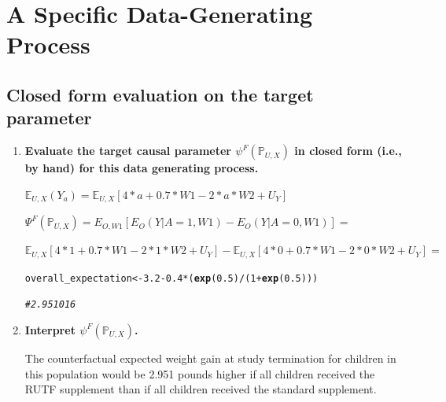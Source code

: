 \documentclass{article}\usepackage[]{graphicx}\usepackage[]{xcolor}
\makeatletter
\newcommand{\hlnum}[1]{\textcolor[rgb]{0.686,0.059,0.569}{#1}}%
\newcommand{\hlcom}[1]{\textcolor[rgb]{0.678,0.584,0.686}{\textit{#1}}}%
\newcommand{\hlopt}[1]{\textcolor[rgb]{0,0,0}{#1}}%
\newcommand{\hlstd}[1]{\textcolor[rgb]{0.345,0.345,0.345}{#1}}%
\newcommand{\hlkwb}[1]{\textcolor[rgb]{0.69,0.353,0.396}{#1}}%
\newcommand{\hlkwd}[1]{\textcolor[rgb]{0.737,0.353,0.396}{\textbf{#1}}}%
\newenvironment{kframe}{%
 \def\at@end@of@kframe{}%
 \ifinner\ifhmode%
  \def\at@end@of@kframe{\end{minipage}}%
  \begin{minipage}{\columnwidth}%
 \fi\fi%
 \def\FrameCommand##1{\hskip\@totalleftmargin \hskip-\fboxsep
 \colorbox{shadecolor}{##1}\hskip-\fboxsep
     \hskip-\linewidth \hskip-\@totalleftmargin \hskip\columnwidth}%
 \MakeFramed {\advance\hsize-\width
   \@totalleftmargin\z@ \linewidth\hsize
   \@setminipage}}%
 {\par\unskip\endMakeFramed%
 \at@end@of@kframe}
\newenvironment{knitrout}{}{} %
\makeatother
\begin{document}
\pagebreak











\section{A Specific Data-Generating Process}

  \subsection{Closed form evaluation on the target parameter}
  
    \begin{enumerate}[label=\textbf{\arabic*.}]
    
      \item \textbf{Evaluate the target causal parameter $\psi^F(\mathbb{P}_{U,X})$ in closed form (i.e., by hand) for this data generating process.}
      
      $\mathbb{E}_{U,X}(Y_a) = \mathbb{E}_{U,X}[4*a + 0.7 * W1 - 2*a*W2 + U_Y]$
      
      $\Psi^F(\mathbb{P}_{U,X}) = E_{O, W1}[E_O(Y | A=1, W1) - E_O(Y | A=0, W1)] = $
      
      $\mathbb{E}_{U,X}[4*1 + 0.7*W1 - 2*1*W2 + U_Y] - \mathbb{E}_{U,X}[4*0 + 0.7*W1 - 2*0*W2 + U_Y] = $
      
      
\begin{knitrout}
\color{fgcolor}\begin{kframe}
\begin{alltt}
\hlstd{overall_expectation} \hlkwb{<-} \hlnum{3.2} \hlopt{-} \hlnum{0.4}\hlopt{*}\hlstd{(}\hlkwd{exp}\hlstd{(}\hlnum{0.5}\hlstd{)} \hlopt{/} \hlstd{(}\hlnum{1} \hlopt{+} \hlkwd{exp}\hlstd{(}\hlnum{0.5}\hlstd{)))}

\hlcom{# 2.951016}
\end{alltt}
\end{kframe}
\end{knitrout}
      
      
      
      
      
      
      \item \textbf{Interpret $\psi^F(\mathbb{P}_{U,X})$.}
      
      The counterfactual expected weight gain at study termination for children in this population would be 2.951 pounds higher if all children received the RUTF supplement than if all children received the standard supplement.
  
    \end{enumerate}
    
\end{document}
